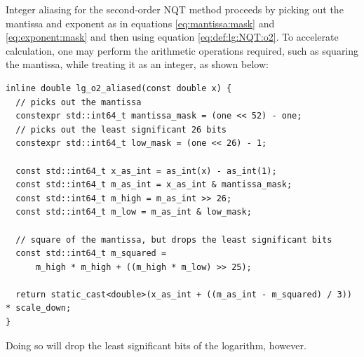 \documentclass[linenumbers,twocolumn]{aastex631}
\begin{document}
Integer aliasing for the second-order NQT method proceeds by picking out the mantissa and exponent as in equations \eqref{eq:mantissa:mask} and \eqref{eq:exponent:mask} and then using equation \eqref{eq:def:lg:NQT:o2}. To accelerate calculation, one may perform the arithmetic operations required, such as squaring the mantissa, while treating it as an integer, as shown below:
\begin{lstlisting}[caption={The integer-aliased NQTo2 log}, label={lst:nqto2}]
inline double lg_o2_aliased(const double x) {
  // picks out the mantissa
  constexpr std::int64_t mantissa_mask = (one << 52) - one;
  // picks out the least significant 26 bits
  constexpr std::int64_t low_mask = (one << 26) - 1;

  const std::int64_t x_as_int = as_int(x) - as_int(1);
  const std::int64_t m_as_int = x_as_int & mantissa_mask;
  const std::int64_t m_high = m_as_int >> 26;
  const std::int64_t m_low = m_as_int & low_mask;
  
  // square of the mantissa, but drops the least significant bits
  const std::int64_t m_squared =
      m_high * m_high + ((m_high * m_low) >> 25);

  return static_cast<double>(x_as_int + ((m_as_int - m_squared) / 3)) * scale_down;
}
\end{lstlisting}
Doing so will drop the least significant bits of the logarithm, however.

{}



\end{document}
